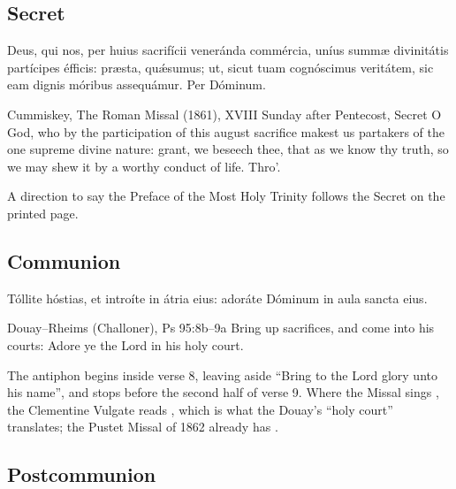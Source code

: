 \subsection{Secret}
\label{proper-secret}


\begin{latinproper}
Deus, qui nos, per huius sacrifícii veneránda commércia, uníus summæ
divinitátis partícipes éfficis: præsta, quǽsumus; ut, sicut tuam cognóscimus
veritátem, sic eam dignis móribus assequámur. Per Dóminum.
\end{latinproper}

\begin{englishwitness}{Cummiskey, The Roman Missal (1861), XVIII Sunday after Pentecost, Secret}
O God, who by the participation of this august sacrifice makest us partakers of
the one supreme divine nature: grant, we beseech thee, that as we know thy
truth, so we may shew it by a worthy conduct of life. Thro'.
\end{englishwitness}

\noindent A direction to say the Preface of the Most Holy Trinity follows the
Secret on the printed page.

\subsection{Communion}
\label{proper-communion}


\begin{latinproper}
Tóllite hóstias, et introíte in átria eius: adoráte Dóminum in aula sancta
eius.
\end{latinproper}

\begin{englishwitness}{Douay--Rheims (Challoner), Ps 95:8b--9a}
Bring up sacrifices, and come into his courts: Adore ye the Lord in his holy
court.
\end{englishwitness}

\noindent The antiphon begins inside verse 8, leaving aside ``Bring to the Lord
glory unto his name'', and stops before the second half of verse 9. Where the
Missal sings , the Clementine Vulgate reads
, which is what the Douay's ``holy court''
translates; the Pustet Missal of 1862 already has .

\subsection{Postcommunion}
\label{proper-postcommunion}


